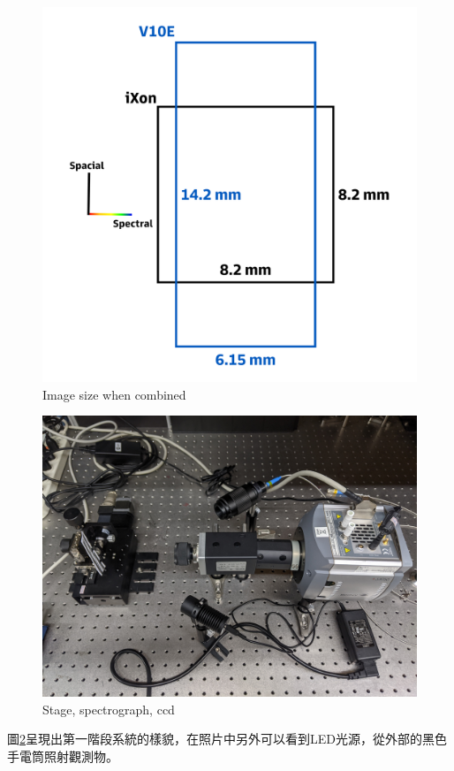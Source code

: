 \documentclass[12pt]{article}
\begin{document}
\begin{figure}[t]
    \centering
    \includegraphics[width=0.5\linewidth]{imagesize.jpg}
    \caption{Image size when combined}
    \label{figure: image size}
\end{figure}

\begin{figure}[t]
    \centering
    \includegraphics[width=0.65\linewidth]{PXL_20210723_094307842.jpg}
    \caption{Stage, spectrograph, ccd}
    \label{figure: 1 stage setup}
\end{figure}

圖\ref{figure: 1 stage setup}呈現出第一階段系統的樣貌，在照片中另外可以看到LED光源，從外部的黑色手電筒照射觀測物。
\end{document}
